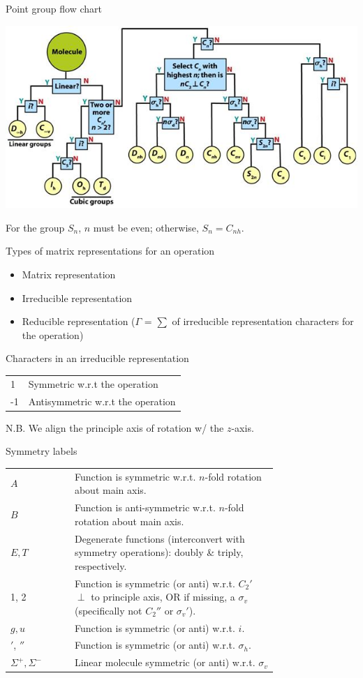 \documentclass[10pt,landscape]{article}
\newcommand{\extraline}{\vspace{1em}}
\newcommand{\tableindent}{\hspace{1.5em}}
\begin{document}
\begin{multicols}{3}
Point group flow chart
\vspace{-1.5em}
\begin{center}
	\includegraphics[width=\linewidth]{./chm2311/point-group-chart.jpeg}
\end{center}
\vspace{-1em}
\tableindent For the group $S_n$, $n$ must be even; otherwise, $S_n = C_{nh}$.
\extraline

Types of matrix representations for an operation
\begin{itemize}
	\item Matrix representation
	\item Irreducible representation
	\item Reducible representation ($\Gamma$ = $\sum$ of irreducible representation characters for the operation)
\end{itemize}

Characters in an irreducible representation
\begin{tabular}{@{\tableindent}ll@{}}
	1 & Symmetric w.r.t the operation \\
	-1 & Antisymmetric w.r.t the operation \\
\end{tabular}

\tableindent N.B. We align the principle axis of rotation w/ the $z$-axis.
\extraline

Symmetry labels
%
\renewcommand{\arraystretch}{1.4}
\begin{tabular}{@{\tableindent}lp{0.76\linewidth}@{}}
	$A$ & Function is symmetric w.r.t. $n$-fold rotation about main axis. \\
	$B$ & Function is anti-symmetric w.r.t. $n$-fold rotation about main axis. \\
	$E, T$ & Degenerate functions (interconvert with symmetry operations): doubly \& triply, respectively. \\
	1, 2 & Function is symmetric (or anti) w.r.t. $C_2'$ $\perp$ to principle axis, OR if missing, a $\sigma_v$ (specifically not $C_2''$ or $\sigma_v'$). \\
	$g, u$ & Function is symmetric (or anti) w.r.t. $i$. \\
	$'$, $''$ & Function is symmetric (or anti) w.r.t. $\sigma_h$. \\
	$\Sigma^+, \Sigma^-$ & Linear molecule symmetric (or anti) w.r.t. $\sigma_v$ \\
\end{tabular}
\renewcommand{\arraystretch}{1}
\medskip


\end{multicols}
\end{document}
